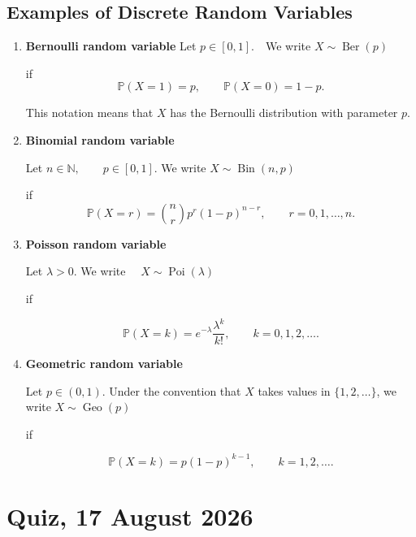 \subsection{Examples of Discrete Random Variables}

\begin{enumerate}

    \item \textbf{Bernoulli random variable}
    Let
    \(
    p\in[0,1].
    \)~~We write
    \(
    X\sim\operatorname{Ber}(p)
    \)

    if
    \[
    \mathbb{P}(X=1)=p,
    \qquad
    \mathbb{P}(X=0)=1-p.
    \]

    This notation means that $X$ has the Bernoulli distribution with
    parameter $p$.

    \item \textbf{Binomial random variable}

    Let
    \(
    n\in\mathbb{N},
    \qquad
    p\in[0,1].
    \)
    We write
    \(
    X\sim\operatorname{Bin}(n,p)
    \)

    if
    \[
    \mathbb{P}(X=r)
    =
    \binom{n}{r}
    p^r(1-p)^{n-r},
    \qquad
    r=0,1,\ldots,n.
    \]

    \item \textbf{Poisson random variable}

    Let
    \(
    \lambda>0.
    \)
    We write~~ 
    \(
    X\sim\operatorname{Poi}(\lambda)
    \)

    if

    \[
    \mathbb{P}(X=k)
    =
    e^{-\lambda}
    \frac{\lambda^k}{k!},
    \qquad
    k=0,1,2,\ldots.
    \]

    \item \textbf{Geometric random variable}

    Let
    \(
    p\in(0,1).
    \)
    Under the convention that $X$ takes values in
    $\{1,2,\ldots\}$, we write
    \(
    X\sim\operatorname{Geo}(p)
    \)

    if

    \[
    \mathbb{P}(X=k)
    =
    p(1-p)^{k-1},
    \qquad
    k=1,2,\ldots.
    \]

\end{enumerate}



\lectureend

\section{Quiz, 17 August 2026 }

